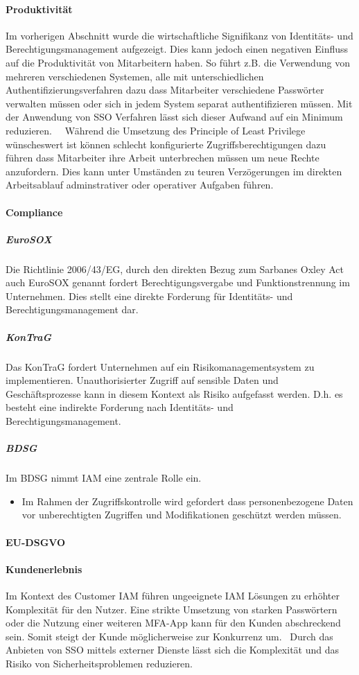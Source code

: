 \documentclass[12pt]{article}
\begin{document}
\paragraph{Produktivität}
Im vorherigen Abschnitt wurde die wirtschaftliche Signifikanz von Identitäts- und Berechtigungsmanagement aufgezeigt. Dies kann jedoch einen negativen Einfluss auf die Produktivität von Mitarbeitern haben. So führt z.B. die Verwendung von mehreren verschiedenen Systemen, alle mit unterschiedlichen Authentifizierungsverfahren dazu dass Mitarbeiter verschiedene Passwörter verwalten müssen oder sich in jedem System separat authentifizieren müssen. Mit der Anwendung von SSO Verfahren lässt sich dieser Aufwand auf ein Minimum reduzieren.~\cite{radha2012survey}~\cite{haag2012selecting} Während die Umsetzung des Principle of Least Privilege wünscheswert ist können schlecht konfigurierte Zugriffsberechtigungen dazu führen dass Mitarbeiter ihre Arbeit unterbrechen müssen um neue Rechte anzufordern. Dies kann unter Umständen zu teuren Verzögerungen im direkten Arbeitsablauf adminstrativer oder operativer Aufgaben führen.~\cite{weishaupl2015towards}
\paragraph{Compliance}
\subparagraph{EuroSOX}
Die Richtlinie 2006/43/EG, durch den direkten Bezug zum Sarbanes Oxley Act auch EuroSOX genannt fordert Berechtigungsvergabe und Funktionstrennung im Unternehmen. Dies stellt eine direkte Forderung für Identitäts- und Berechtigungsmanagement dar.~\cite{conta2017leitfaden}
\subparagraph{KonTraG}
Das KonTraG fordert Unternehmen auf ein Risikomanagementsystem zu implementieren. Unauthorisierter Zugriff auf sensible Daten und Geschäftsprozesse kann in diesem Kontext als Risiko aufgefasst werden. D.h. es besteht eine indirekte Forderung nach Identitäts- und Berechtigungsmanagement.~\cite{conta2017leitfaden}
\subparagraph{BDSG}
Im BDSG nimmt IAM eine zentrale Rolle ein.
\begin{itemize}
  \item Im Rahmen der Zugriffskontrolle wird gefordert dass personenbezogene Daten vor unberechtigten Zugriffen und Modifikationen geschützt werden müssen.~\cite{conta2017leitfaden}
\end{itemize}
\paragraph{EU-DSGVO}
\paragraph{Kundenerlebnis}
Im Kontext des Customer IAM führen ungeeignete IAM Lösungen zu erhöhter Komplexität für den Nutzer. Eine strikte Umsetzung von starken Passwörtern oder die Nutzung einer weiteren MFA-App kann für den Kunden abschreckend sein. Somit steigt der Kunde möglicherweise zur Konkurrenz um.~\cite{azhar2014economics} Durch das Anbieten von SSO mittels externer Dienste lässt sich die Komplexität und das Risiko von Sicherheitsproblemen reduzieren.
\end{document}
